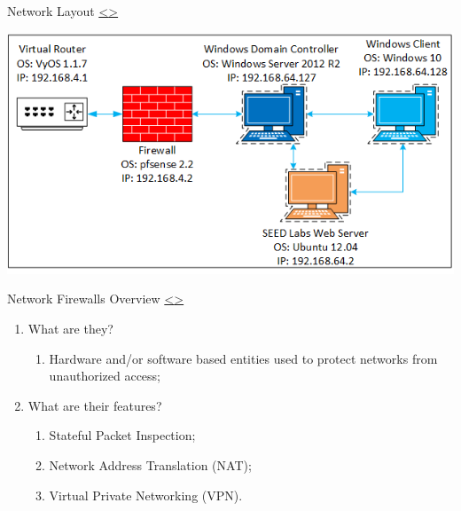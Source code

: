 \documentclass[12pt]{extarticle}
\newenvironment{instructionblock}{\Large\bgroup}{\egroup}
\begin{document}
\pagebreak
\begin{slide}{ Network Layout }{ \hyperref[slide 3]{\textless}\hyperref[slide 5]{\textgreater} }
\vskip 5pt
	\begin{instructionblock}
		\begin{center}
			\includegraphics[scale=0.80]{NetworkDiagram.png}
		\end{center}

	\end{instructionblock}
\end{slide}







\pagebreak
\begin{slide}{ Network Firewalls Overview }{ \hyperref[slide 4]{\textless}\hyperref[slide 6]{\textgreater} }
\vskip 5pt
\begin{instructionblock}
\begin{enumerate}
\item What are they?
\begin{enumerate}
\item Hardware and/or software based entities used to protect networks from unauthorized access;
\end{enumerate}
\item What are their features?
\begin{enumerate}
\item Stateful Packet Inspection;
\item Network Address Translation (NAT);
\item Virtual Private Networking (VPN).
\end{enumerate}
\end{enumerate}

\end{instructionblock}
\end{slide}
\end{document}
